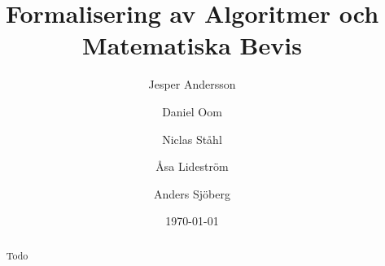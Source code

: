 \documentclass[a4paper]{article}
\title{Formalisering av Algoritmer och Matematiska Bevis}
\author[1]{Jesper Andersson}
\author[1]{Daniel Oom}
\author[1]{Niclas Ståhl}
\author[2]{Åsa Lideström}
\author[2]{Anders Sjöberg}
\affil[1]{Datateknik, Chalmers}
\affil[2]{Mattematik, Göteborgs Universitet}
\date{\today}
\begin{document}
\begin{abstract}
Todo
\end{abstract}

\maketitle
\thispagestyle{empty}
\newpage
\tableofcontents
\newpage







\nocite{*}

\appendix



\end{document}
